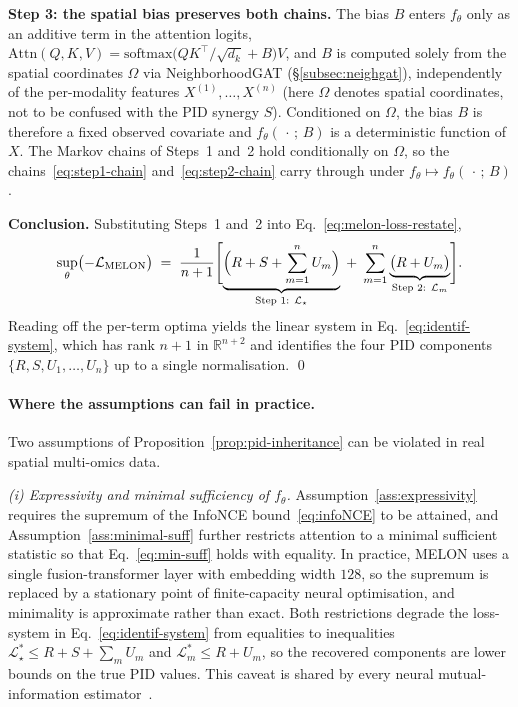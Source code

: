 \documentclass{article}
\theoremstyle{plain}
\theoremstyle{definition}
\begin{document}
\textbf{Step 3: the spatial bias preserves both chains.}
The bias $B$ enters $f_\theta$ only as an additive term in the attention logits, $\mathrm{Attn}(Q, K, V) = \mathrm{softmax}\bigl(QK^\top/\sqrt{d_k} + B\bigr)V$, and $B$ is computed solely from the spatial coordinates $\Omega$ via NeighborhoodGAT (\S\ref{subsec:neighgat}), independently of the per-modality features $X^{(1)}, \ldots, X^{(n)}$ (here $\Omega$ denotes spatial coordinates, not to be confused with the PID synergy $S$). Conditioned on $\Omega$, the bias $B$ is therefore a fixed observed covariate and $f_\theta(\,\cdot\,;\, B)$ is a deterministic function of $X$. The Markov chains of Steps~1 and~2 hold conditionally on $\Omega$, so the chains~\eqref{eq:step1-chain} and~\eqref{eq:step2-chain} carry through under $f_\theta \mapsto f_\theta(\,\cdot\,;\, B)$.

\textbf{Conclusion.} Substituting Steps~1 and~2 into Eq.~\eqref{eq:melon-loss-restate},
\begin{equation}\label{eq:final}
\sup_{\theta} \bigl(-\mathcal{L}_{\mathrm{MELON}}\bigr)
  \;=\; \frac{1}{n+1}\Biggl[
    \underbrace{\Bigl(R + S + \sum_{m=1}^{n} U_m\Bigr)}_{\text{Step 1: } \mathcal{L}_{\star}}
    \;+\;
    \sum_{m=1}^{n} \underbrace{\bigl(R + U_m\bigr)}_{\text{Step 2: } \mathcal{L}_{m}}
  \Biggr].
\end{equation}
Reading off the per-term optima yields the linear system in Eq.~\eqref{eq:identif-system}, which has rank $n+1$ in $\mathbb{R}^{n+2}$ and identifies the four PID components $\{R, S, U_1, \ldots, U_n\}$ up to a single normalisation. \qed

\paragraph{Where the assumptions can fail in practice.}
Two assumptions of Proposition~\ref{prop:pid-inheritance} can be violated in real spatial multi-omics data.

\emph{(i) Expressivity and minimal sufficiency of $f_\theta$.} Assumption~\ref{ass:expressivity} requires the supremum of the InfoNCE bound~\eqref{eq:infoNCE} to be attained, and Assumption~\ref{ass:minimal-suff} further restricts attention to a minimal sufficient statistic so that Eq.~\eqref{eq:min-suff} holds with equality. In practice, MELON uses a single fusion-transformer layer with embedding width $128$, so the supremum is replaced by a stationary point of finite-capacity neural optimisation, and minimality is approximate rather than exact. Both restrictions degrade the loss-system in Eq.~\eqref{eq:identif-system} from equalities to inequalities $\mathcal{L}_{\star}^{*} \le R + S + \sum_{m} U_m$ and $\mathcal{L}_{m}^{*} \le R + U_m$, so the recovered components are lower bounds on the true PID values. This caveat is shared by every neural mutual-information estimator~\citep{oord2018representation,tian2020contrastive}.
\end{document}
